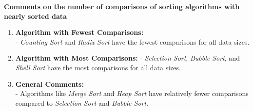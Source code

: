 \textbf{Comments on the number of comparisons of sorting algorithms with nearly sorted data}

\begin{enumerate}
    \item \textbf{Algorithm with Fewest Comparisons:} \\
  - \textit{Counting Sort} and \textit{Radix Sort} have the fewest comparisons for all data sizes.

    \item \textbf{Algorithm with Most Comparisons:}
  - \textit{Selection Sort}, \textit{Bubble Sort}, and \textit{Shell Sort} have the most comparisons for all data sizes.

    \item \textbf{General Comments:} \\
  - Algorithms like \textit{Merge Sort} and \textit{Heap Sort} have relatively fewer comparisons compared to \textit{Selection Sort} and \textit{Bubble Sort}.
\end{enumerate}


